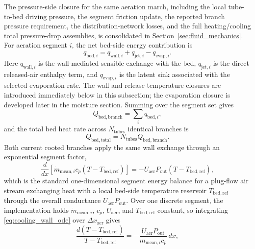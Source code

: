 \documentclass[11pt]{article}
\begin{document}
The pressure-side closure for the same aeration march, including the local tube-to-bed driving pressure, the segment friction update, the reported branch pressure requirement, the distribution-network losses, and the full heating/cooling total pressure-drop assemblies, is consolidated in Section~\ref{sec:fluid_mechanics}.
For aeration segment \(i\), the net bed-side energy contribution is
\begin{equation}
\label{eq:aeration_q_net}
q_{\mathrm{bed},i}=q_{\mathrm{wall},i}+q_{\mathrm{jet},i}-q_{\mathrm{evap},i}.
\end{equation}
Here \(q_{\mathrm{wall},i}\) is the wall-mediated sensible exchange with the bed, \(q_{\mathrm{jet},i}\) is the direct released-air enthalpy term, and \(q_{\mathrm{evap},i}\) is the latent sink associated with the selected evaporation rate. The wall and release-temperature closures are introduced immediately below in this subsection; the evaporation closure is developed later in the moisture section.
Summing over the segment set gives
\begin{equation}
\label{eq:aeration_branch_q}
Q_{\mathrm{bed,branch}}=\sum_i q_{\mathrm{bed},i},
\end{equation}
and the total bed heat rate across \(N_{\mathrm{tubes}}\) identical branches is
\begin{equation}
\label{eq:aeration_total_q}
Q_{\mathrm{bed,total}}=N_{\mathrm{tubes}}Q_{\mathrm{bed,branch}}.
\end{equation}
Both current rooted branches apply the same wall exchange through an exponential segment factor,
\begin{equation}
\label{eq:cooling_wall_ode}
\frac{d}{dx}\!\left[\dot m_{\mathrm{mean},i}c_p\left(T-T_{\mathrm{bed,ref}}\right)\right]
=-U_{\mathrm{aer}}P_{\mathrm{out}}\left(T-T_{\mathrm{bed,ref}}\right),
\end{equation}
which is the standard one-dimensional segment energy balance for a plug-flow air stream exchanging heat with a local bed-side temperature reservoir \(T_{\mathrm{bed,ref}}\) through the overall conductance \(U_{\mathrm{aer}}P_{\mathrm{out}}\). Over one discrete segment, the implementation holds \(\dot m_{\mathrm{mean},i}\), \(c_p\), \(U_{\mathrm{aer}}\), and \(T_{\mathrm{bed,ref}}\) constant, so integrating \eqref{eq:cooling_wall_ode} over \(\Delta x_{\mathrm{aer}}\) gives
\begin{equation}
\label{eq:cooling_wall_separated}
\frac{d\!\left(T-T_{\mathrm{bed,ref}}\right)}
{T-T_{\mathrm{bed,ref}}}
=
-\frac{U_{\mathrm{aer}}P_{\mathrm{out}}}
{\dot m_{\mathrm{mean},i}c_p}\,dx,
\end{equation}
\end{document}
